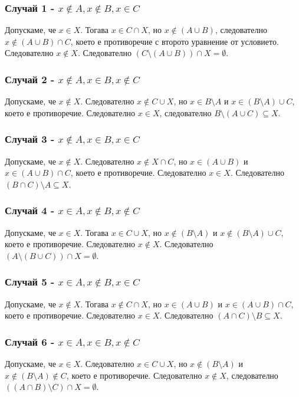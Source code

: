 \documentclass[12pt]{article}
\begin{document}
\subsubsection*{Случай 1 - $x \not\in A, x \not\in B, x \in C$}
Допускаме, че $x \in X$. Тогава $x \in C \cap X$, но $x \not\in (A \cup B)$, следователно $x \not\in (A \cup B) \cap C$, което е противоречие с второто уравнение от условието. Следователно $x \not\in X$. Следователно $(C \setminus (A \cup B)) \cap X = \emptyset$.
\subsubsection*{Случай 2 - $x \not\in A, x \in B, x \not\in C$}
Допускаме, че $x \not\in X$. Следователно $x \not\in C \cup X$, но $x \in B \setminus A$ и $x \in (B \setminus A) \cup C$, което е противоречие. Следователно $x \in X$, следователно $B \setminus (A \cup C) \subseteq X$.
\subsubsection*{Случай 3 - $x \not\in A, x \in B, x \in C$}
Допускаме, че $x \not\in X$. Следователно $x \not\in X \cap C$, но $x \in (A \cup B)$ и $x \in (A \cup B) \cap C$, което е противоречие. Следователно $x \in X$. Следователно $(B \cap C) \setminus A \subseteq X$.
\subsubsection*{Случай 4 - $x \in A, x \not\in B, x \not\in C$}
Допускаме, че $x \in X$. Тогава $x \in C \cup X$, но $x \not\in (B \setminus A)$ и $x \not\in (B \setminus A) \cup C$, което е противоречие. Следователно $x \not\in X$. Следователно $(A \setminus (B \cup C)) \cap X = \emptyset$.
\subsubsection*{Случай 5 - $x \in A, x \not\in B, x \in C$}
Допускаме, че $x \not\in X$. Тогава $x \not\in C \cap X$, но $x \in (A \cup B)$ и $x \in (A \cup B) \cap C$, което е противоречие. Следователно $x \in X$. Следователно $(A \cap C) \setminus B \subseteq X$.
\subsubsection*{Случай 6 - $x \in A, x \in B, x \not\in C$}
Допускаме, че $x \in X$. Следователно $x \in C \cup X$, но $x \not\in (B \setminus A)$ и $x \not\in (B \setminus A) \not\in C$, което е противоречие. Следователно $x \not\in X$, следователно $((A \cap B) \setminus C) \cap X = \emptyset$.
\end{document}
